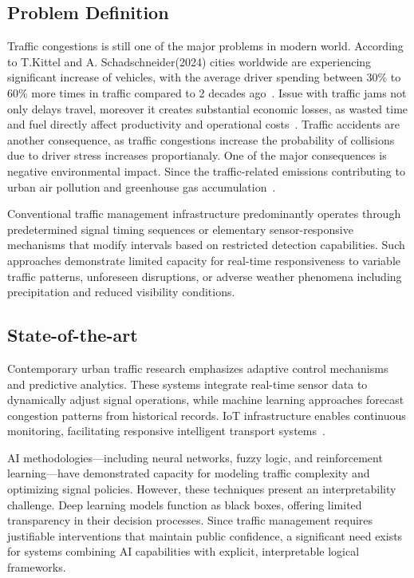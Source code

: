 \documentclass{article}
\begin{document}
\subsection{Problem Definition}

Traffic congestions is still one of the major problems in modern world. According to T.Kittel and A. Schadschneider(2024) cities worldwide are experiencing significant increase of vehicles, with the average driver spending between 30\% to 60\% more times in traffic compared to 2 decades ago~\cite{epj_scaling_2024}. Issue with traffic jams not only delays travel, moreover it creates substantial economic losses, as wasted time and fuel directly affect productivity and operational costs~\cite{jiang_spatiotemporal_2017}. Traffic accidents are another consequence, as traffic congestions increase the probability of collisions due to driver stress increases proportianaly. One of the major consequences is negative environmental impact. Since the traffic-related emissions contributing to urban air pollution and greenhouse gas accumulation~\cite{epj_scaling_2024}.

Conventional traffic management infrastructure predominantly operates through predetermined signal timing sequences or elementary sensor-responsive mechanisms that modify intervals based on restricted detection capabilities. Such approaches demonstrate limited capacity for real-time responsiveness to variable traffic patterns, unforeseen disruptions, or adverse weather phenomena including precipitation and reduced visibility conditions.

\subsection{State-of-the-art}

Contemporary urban traffic research emphasizes adaptive control mechanisms and predictive analytics. These systems integrate real-time sensor data to dynamically adjust signal operations, while machine learning approaches forecast congestion patterns from historical records. IoT infrastructure enables continuous monitoring, facilitating responsive intelligent transport systems~\cite{spillo_neuro_symbolic_2024}.

AI methodologies—including neural networks, fuzzy logic, and reinforcement learning—have demonstrated capacity for modeling traffic complexity and optimizing signal policies. However, these techniques present an interpretability challenge. Deep learning models function as black boxes, offering limited transparency in their decision processes. Since traffic management requires justifiable interventions that maintain public confidence, a significant need exists for systems combining AI capabilities with explicit, interpretable logical frameworks.
\end{document}
